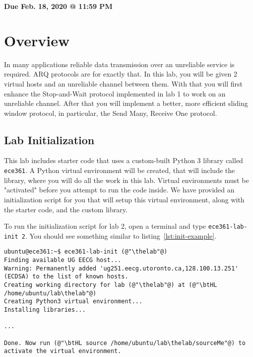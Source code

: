 \documentclass[11pt]{article}
\makeatletter
\def\thelab{2}
\def\datedue{Feb. 18, 2020 @ 11:59 PM}
\makeatother
\begin{document}
\maketitle \thispagestyle{fancy}
\hfill {\large \textbf{Due \datedue}}


\section{Overview}
\label{sec:overview}
In many applications reliable data transmission over an unreliable service is required. ARQ protocols are for exactly that. In this lab, you will be given 2 virtual hosts and an unreliable channel between them. With that you will first enhance the Stop-and-Wait protocol implemented in lab 1 to work on an unreliable channel. After that you will implement a better, more efficient sliding window protocol, in particular, the Send Many, Receive One protocol.

\subsection{Lab Initialization}
\label{subsec:lab-init}
This lab includes starter code that uses a custom-built Python 3 library called \texttt{ece361}. A Python virtual environment will be created, that will include the library, where you will do all the work in this lab. Virtual environments must be "activated" before you attempt to run the code inside. We have provided an initialization script for you that will setup this virtual environment, along with the starter code, and the custom library.


To run the initialization script for lab \thelab, open a terminal and type \texttt{ece361-lab-init \thelab}. You should see something similar to listing~\ref{lst:init-example}.
\begin{lstlisting}[style=ece361shell, caption={Initializing lab \thelab.}, label={lst:init-example}]
ubuntu@ece361:~$ ece361-lab-init (@"\thelab"@)
Finding available UG EECG host...
Warning: Permanently added 'ug251.eecg.utoronto.ca,128.100.13.251' (ECDSA) to the list of known hosts.
Creating working directory for lab (@"\thelab"@) at (@"\btHL /home/ubuntu/lab\thelab"@)
Creating Python3 virtual environment...
Installing libraries...

...

Done. Now run (@"\btHL source /home/ubuntu/lab\thelab/sourceMe"@) to activate the virtual environment.
\end{lstlisting}
\end{document}
